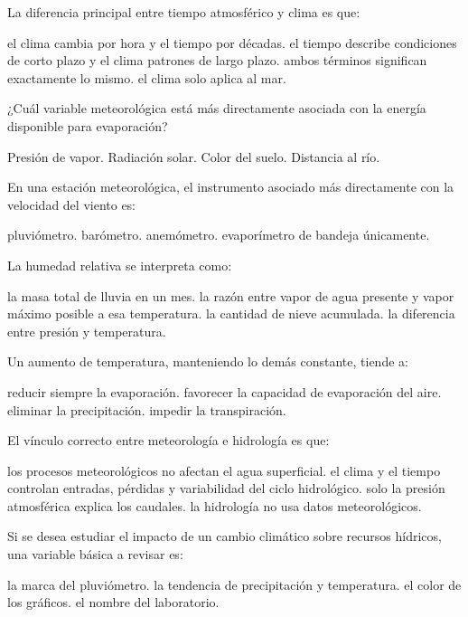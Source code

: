 \question [2] La diferencia principal entre tiempo atmosférico y clima es que:
\begin{choices}
\choice el clima cambia por hora y el tiempo por décadas.
\CorrectChoice el tiempo describe condiciones de corto plazo y el clima patrones de largo plazo.
\choice ambos términos significan exactamente lo mismo.
\choice el clima solo aplica al mar.
\end{choices}

\question [2] ¿Cuál variable meteorológica está más directamente asociada con la energía disponible para evaporación?
\begin{choices}
\choice Presión de vapor.
\CorrectChoice Radiación solar.
\choice Color del suelo.
\choice Distancia al río.
\end{choices}

\question [2] En una estación meteorológica, el instrumento asociado más directamente con la velocidad del viento es:
\begin{choices}
\choice pluviómetro.
\choice barómetro.
\CorrectChoice anemómetro.
\choice evaporímetro de bandeja únicamente.
\end{choices}

\question [2] La humedad relativa se interpreta como:
\begin{choices}
\choice la masa total de lluvia en un mes.
\CorrectChoice la razón entre vapor de agua presente y vapor máximo posible a esa temperatura.
\choice la cantidad de nieve acumulada.
\choice la diferencia entre presión y temperatura.
\end{choices}

\question [2] Un aumento de temperatura, manteniendo lo demás constante, tiende a:
\begin{choices}
\choice reducir siempre la evaporación.
\CorrectChoice favorecer la capacidad de evaporación del aire.
\choice eliminar la precipitación.
\choice impedir la transpiración.
\end{choices}

\question [3] El vínculo correcto entre meteorología e hidrología es que:
\begin{choices}
\choice los procesos meteorológicos no afectan el agua superficial.
\CorrectChoice el clima y el tiempo controlan entradas, pérdidas y variabilidad del ciclo hidrológico.
\choice solo la presión atmosférica explica los caudales.
\choice la hidrología no usa datos meteorológicos.
\end{choices}

\question [3] Si se desea estudiar el impacto de un cambio climático sobre recursos hídricos, una variable básica a revisar es:
\begin{choices}
\choice la marca del pluviómetro.
\CorrectChoice la tendencia de precipitación y temperatura.
\choice el color de los gráficos.
\choice el nombre del laboratorio.
\end{choices}

